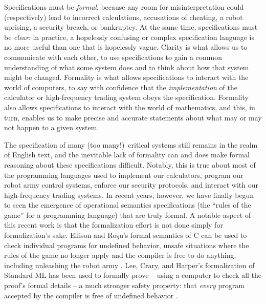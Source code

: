 Specifications must be {\it formal}, because any room for
misinterpretation could (respectively) lead to incorrect calculations,
accusations of cheating, a robot uprising, a security breach, or
bankruptcy. At the same time, specifications must be {\it clear}: in
practice, a hopelessly confusing or complex specification language is
no more useful than one that is hopelessly vague. Clarity is what
allows us to communicate with each other, to use specifications to
gain a common understanding of what some system does and to think
about how that system might be changed. Formality is what allows
specifications to interact with the world of computers, to say with
confidence that the {\it implementation} of the calculator or
high-frequency trading system obeys the specification. Formality also
allows specifications to interact with the world of mathematics, and
this, in turn, enables us to make precise and accurate statements
about what may or may not happen to a given system.

The specification of many (too many!)~critical systems still remains
in the realm of English text, and the inevitable lack of formality can
and does make formal reasoning about these specifications difficult.
Notably, this is true about most of the programming languages used to
implement our calculators, program our robot army control systems,
enforce our security protocols, and interact with our high-frequency
trading systems. In recent years, however, we have finally begun to
seen the emergence of operational semantics specifications (the
``rules of the game'' for a programming language) that are truly
formal. A notable aspect of this recent work is that the formalization
effort is not done simply for formalization's sake. Ellison and Ro{\c
  s}u's formal semantics of C can be used to check individual programs
for undefined behavior, unsafe situations where the rules of the game
no longer apply and the compiler is free to do anything, including
unleashing the robot army \cite{ellison12executable}. Lee, Crary, and
Harper's formalization of Standard ML has been used to formally prove
-- using a computer to check all the proof's formal details -- a much
stronger safety property: that {\it every} program accepted by the
compiler is free of undefined behavior \cite{lee07towards}.

